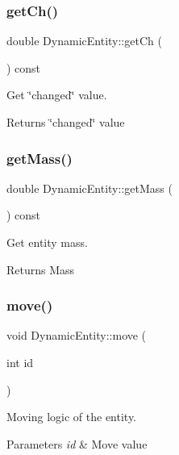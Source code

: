 \subsubsection{\texorpdfstring{get\+Ch()}{getCh()}}
{\footnotesize\ttfamily double Dynamic\+Entity\+::get\+Ch (\begin{DoxyParamCaption}{ }\end{DoxyParamCaption}) const}



Get \char`\"{}changed\char`\"{} value. 

\begin{DoxyReturn}{Returns}
\char`\"{}changed\char`\"{} value 
\end{DoxyReturn}
\mbox{\label{class_dynamic_entity_a31d63938cbf1108662af89abb31627cb}} 
\subsubsection{\texorpdfstring{get\+Mass()}{getMass()}}
{\footnotesize\ttfamily double Dynamic\+Entity\+::get\+Mass (\begin{DoxyParamCaption}{ }\end{DoxyParamCaption}) const}



Get entity mass. 

\begin{DoxyReturn}{Returns}
Mass 
\end{DoxyReturn}
\mbox{\label{class_dynamic_entity_aed1bbf1428250f9db5b8b141edf5ba50}} 
\subsubsection{\texorpdfstring{move()}{move()}}
{\footnotesize\ttfamily void Dynamic\+Entity\+::move (\begin{DoxyParamCaption}\item[{int}]{id }\end{DoxyParamCaption})}



Moving logic of the entity. 


\begin{DoxyParams}{Parameters}
{\em id} & Move value \\
\hline
\end{DoxyParams}
\mbox{\label{class_dynamic_entity_a556f50037ce6eb99cd7d1498242e1e85}} 
